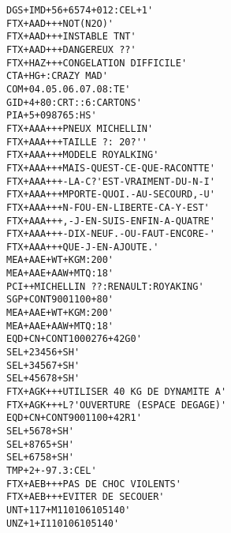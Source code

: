 \begin{lstlisting}
DGS+IMD+56+6574+012:CEL+1'
FTX+AAD+++NOT(N2O)'
FTX+AAD+++INSTABLE TNT'
FTX+AAD+++DANGEREUX ??'
FTX+HAZ+++CONGELATION DIFFICILE'
CTA+HG+:CRAZY MAD'
COM+04.05.06.07.08:TE'
GID+4+80:CRT::6:CARTONS'
PIA+5+098765:HS'
FTX+AAA+++PNEUX MICHELLIN'
FTX+AAA+++TAILLE ?: 20?''
FTX+AAA+++MODELE ROYALKING'
FTX+AAA+++MAIS-QUEST-CE-QUE-RACONTTE'
FTX+AAA+++-LA-C?'EST-VRAIMENT-DU-N-I'
FTX+AAA+++MPORTE-QUOI.-AU-SECOURD,-U'
FTX+AAA+++N-FOU-EN-LIBERTE-CA-Y-EST'
FTX+AAA+++,-J-EN-SUIS-ENFIN-A-QUATRE'
FTX+AAA+++-DIX-NEUF.-OU-FAUT-ENCORE-'
FTX+AAA+++QUE-J-EN-AJOUTE.'
MEA+AAE+WT+KGM:200'
MEA+AAE+AAW+MTQ:18'
PCI++MICHELLIN ??:RENAULT:ROYAKING'
SGP+CONT9001100+80'
MEA+AAE+WT+KGM:200'
MEA+AAE+AAW+MTQ:18'
EQD+CN+CONT1000276+42G0'
SEL+23456+SH'
SEL+34567+SH'
SEL+45678+SH'
FTX+AGK+++UTILISER 40 KG DE DYNAMITE A'
FTX+AGK+++L?'OUVERTURE (ESPACE DEGAGE)'
EQD+CN+CONT9001100+42R1'
SEL+5678+SH'
SEL+8765+SH'
SEL+6758+SH'
TMP+2+-97.3:CEL'
FTX+AEB+++PAS DE CHOC VIOLENTS'
FTX+AEB+++EVITER DE SECOUER'
UNT+117+M110106105140'
UNZ+1+I110106105140'
\end{lstlisting}
